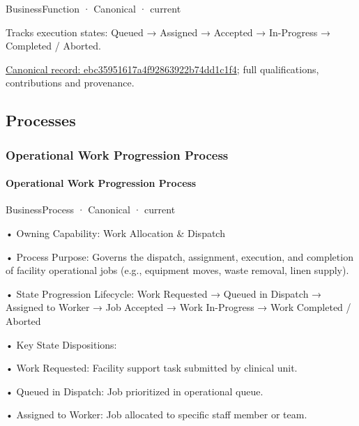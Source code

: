 \label{element:ebc35951617a4f92863922b74dd1c1f4}
{\small BusinessFunction · Canonical · current}\par

Tracks execution states: Queued → Assigned → Accepted → In-Progress → Completed / Aborted.


{\footnotesize \href{../../../../continuum/business/business-function/ebc35951617a4f92863922b74dd1c1f4.md}{Canonical record: ebc35951617a4f92863922b74dd1c1f4}; full qualifications, contributions and provenance.}\par
\subsection{Processes}

\subsubsection{Operational Work Progression Process}

\paragraph{Operational Work Progression Process}

\label{element:5ebba522194b4de5a5b3963e855d712d}
{\small BusinessProcess · Canonical · current}\par

•
Owning Capability: Work Allocation \& Dispatch



•
Process Purpose: Governs the dispatch, assignment, execution, and completion of facility operational jobs (e.g., equipment moves, waste removal, linen supply).



•
State Progression Lifecycle: Work Requested → Queued in Dispatch → Assigned to Worker → Job Accepted → Work In-Progress → Work Completed / Aborted



•
Key State Dispositions:



•
Work Requested: Facility support task submitted by clinical unit.



•
Queued in Dispatch: Job prioritized in operational queue.



•
Assigned to Worker: Job allocated to specific staff member or team.



